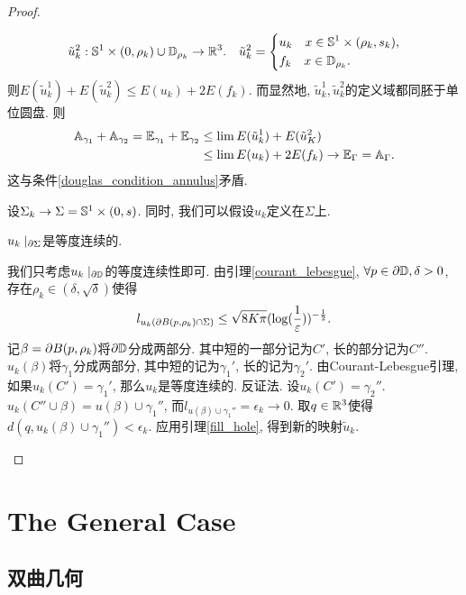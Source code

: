 \begin{proof}
\begin{claim}
\begin{subproof}
\begin{equation}
                \tilde{u}_k^2: \S^1 \times (0,\rho_k) \cup \D_{\rho_k}\to \R^3.  \s  \tilde{u}_k^2=\left\{
                    \begin{aligned}
                        &u_k\s x \in \S^1 \times (\rho_k, s_k),\\
                        &f_k\s x \in \D_{\rho_k}.
                    \end{aligned}
                \right.
            \end{equation}
            则$E(\tilde{u}_k^1)+E(\tilde{u}_k^2) \le E(u_k)+2E(f_k)$. 而显然地, $\tilde{u}_k^1,\tilde{{u}}_k^2$的定义域都同胚于单位圆盘. 则
            \begin{equation}
                \begin{split}
                    \AA_{\gamma_1}+\AA_{\gamma_2} = \EE_{\gamma_1}+\EE_{\gamma_2} & \le  \lim E(\tilde{u}_k^1)+E(\tilde{u}_K^2)  \\
                    &\le \lim E(u_k) + 2E(f_k) \to \EE_\Gamma=\AA_\Gamma.
                \end{split}
            \end{equation}
            这与条件\eqref{douglas_condition_annulus}矛盾.
        \end{subproof}
    \end{claim}
    设$\Sigma_k \to \Sigma = \S^1 \times (0,s)$. 同时, 我们可以假设$u_k$定义在$\Sigma$上.
    \begin{claim}
        $u_k\mid_{\P \Sigma}$是等度连续的.
        \begin{subproof}
            我们只考虑$u_k\mid_{\P \D}$的等度连续性即可.  由引理\eqref{courant_lebesgue}, $\forall p \in \P \D, \delta>0$, 存在$\rho_k \in (\delta,\sqrt{\delta})$使得
            \begin{equation}
                l_{u_k(\P B(p,\rho_k) \cap \Sigma)} \le \sqrt{8K\pi}(\log(\rec{\epsilon}))^{-\rec{2}}.
            \end{equation}
            记$\beta=\P B(p,\rho_k)$将$\P \D$分成两部分. 其中短的一部分记为$C'$, 长的部分记为$C''$. $u_k(\beta)$将$\gamma_1$分成两部分, 其中短的记为$\gamma_1'$, 长的记为$\gamma_2'$. 由Courant-Lebesgue引理,  如果$u_k(C')=\gamma_1'$, 那么$u_k$是等度连续的.  反证法. 设$u_k(C')=\gamma_2''$. $u_k(C''\cup\beta)=u(\beta) \cup \gamma_1''$, 而$l_{u(\beta)\cup \gamma_1''} = \epsilon_k \to 0$. 取$q \in \R^3$使得$d(q, u_k(\beta) \cup \gamma_1'') < \epsilon_k$. 应用引理\eqref{fill_hole}, 得到新的映射$\tilde{u}_k$.
        \end{subproof}
    \end{claim}
\end{proof}
\section{The General Case}
\subsection{双曲几何}